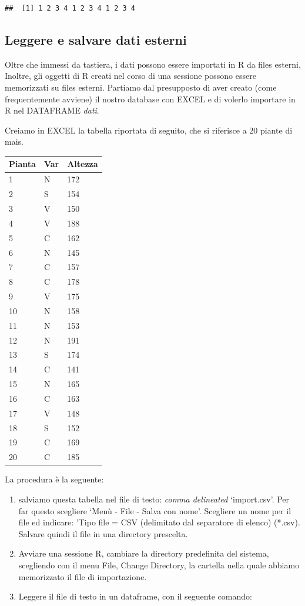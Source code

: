 \documentclass[a4paper,12pt,oneside]{book}
\providecommand{\tightlist}{%
  \setlength{\itemsep}{0pt}\setlength{\parskip}{0pt}}
\begin{document}
\begin{verbatim}
##  [1] 1 2 3 4 1 2 3 4 1 2 3 4
\end{verbatim}

\subsection{Leggere e salvare dati
esterni}\label{leggere-e-salvare-dati-esterni}

Oltre che immessi da tastiera, i dati possono essere importati in R da
files esterni, Inoltre, gli oggetti di R creati nel corso di una
sessione possono essere memorizzati su files esterni. Partiamo dal
presupposto di aver creato (come frequentemente avviene) il nostro
database con EXCEL e di volerlo importare in R nel DATAFRAME
\emph{dati}.

Creiamo in EXCEL la tabella riportata di seguito, che si riferisce a 20
piante di mais.

\begin{longtable}[]{@{}lll@{}}
\toprule
Pianta & Var & Altezza\tabularnewline
\midrule
\endhead
1 & N & 172\tabularnewline
2 & S & 154\tabularnewline
3 & V & 150\tabularnewline
4 & V & 188\tabularnewline
5 & C & 162\tabularnewline
6 & N & 145\tabularnewline
7 & C & 157\tabularnewline
8 & C & 178\tabularnewline
9 & V & 175\tabularnewline
10 & N & 158\tabularnewline
11 & N & 153\tabularnewline
12 & N & 191\tabularnewline
13 & S & 174\tabularnewline
14 & C & 141\tabularnewline
15 & N & 165\tabularnewline
16 & C & 163\tabularnewline
17 & V & 148\tabularnewline
18 & S & 152\tabularnewline
19 & C & 169\tabularnewline
20 & C & 185\tabularnewline
\bottomrule
\end{longtable}

La procedura è la seguente:

\begin{enumerate}
\def\labelenumi{\arabic{enumi}.}
\tightlist
\item
  salviamo questa tabella nel file di testo: \emph{comma delineated}
  `import.csv'. Per far questo scegliere `Menù - File - Salva con nome'.
  Scegliere un nome per il file ed indicare: 'Tipo file = CSV
  (delimitato dal separatore di elenco) (*.csv). Salvare quindi il file
  in una directory prescelta.
\item
  Avviare una sessione R, cambiare la directory predefinita del sistema,
  scegliendo con il menu File, Change Directory, la cartella nella quale
  abbiamo memorizzato il file di importazione.
\item
  Leggere il file di testo in un dataframe, con il seguente comando:
\end{enumerate}
\end{document}
